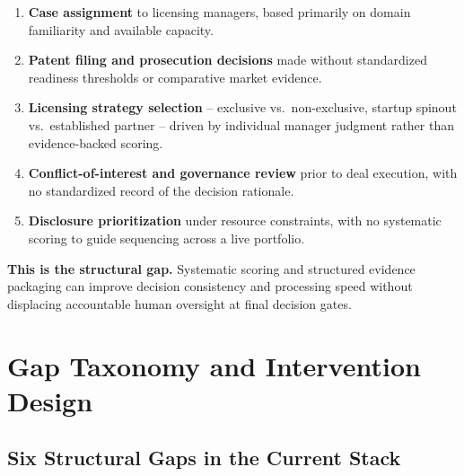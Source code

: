 \documentclass[11pt]{article}
\begin{document}
\begin{enumerate}
  \item \textbf{Case assignment} to licensing managers, based primarily on
        domain familiarity and available capacity.
  \item \textbf{Patent filing and prosecution decisions} made without
        standardized readiness thresholds or comparative market evidence.
  \item \textbf{Licensing strategy selection} -- exclusive vs.\ non-exclusive,
        startup spinout vs.\ established partner -- driven by individual manager
        judgment rather than evidence-backed scoring.
  \item \textbf{Conflict-of-interest and governance review} prior to deal
        execution, with no standardized record of the decision rationale.
  \item \textbf{Disclosure prioritization} under resource constraints, with no
        systematic scoring to guide sequencing across a live portfolio.
\end{enumerate}

\vspace{4pt}
\begin{insightbox}
  \textbf{This is the structural gap.} Systematic scoring and structured evidence
  packaging can improve decision consistency and processing speed without
  displacing accountable human oversight at final decision gates.
\end{insightbox}

\section{Gap Taxonomy and Intervention Design}

\subsection{Six Structural Gaps in the Current Stack}
\end{document}
